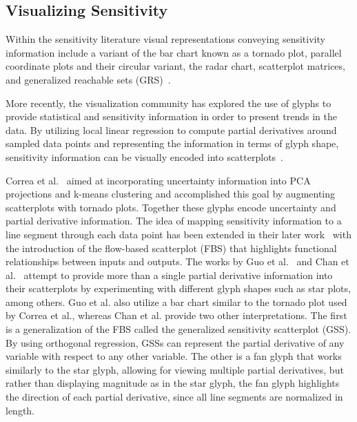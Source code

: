 \subsection{Visualizing Sensitivity}
\label{sec:SA_visualization}
Within the sensitivity literature visual representations conveying sensitivity information include a variant of the bar chart known as a tornado plot, parallel coordinate plots and their circular variant, the radar chart, scatterplot matrices,  and generalized reachable sets (GRS)~\cite{SaltelliChanScott2000,BushenkovChernykhKamenev1995}.

More recently, the visualization community has explored the use of glyphs to provide statistical and sensitivity information in order to present trends in the data.
%
By utilizing local linear regression to compute partial derivatives around sampled data points and representing the information in terms of glyph shape, sensitivity information can be visually encoded into scatterplots~\cite{CorreaChanMa2009,ChanCorreaMa2010,GuoWardRundensteiner2011,ChanCorreaMa2013}.

Correa et al.~\cite{CorreaChanMa2009} aimed at incorporating uncertainty information into PCA projections and k-means clustering and accomplished this goal by augmenting scatterplots with tornado plots.
%
Together these glyphs encode uncertainty and partial derivative information.
%
The idea of mapping sensitivity information to a line segment through each data point has been extended in their later work~\cite{ChanCorreaMa2010} with the introduction of the flow-based scatterplot (FBS) that highlights functional relationships between inputs and outputs.
%
The works by Guo et al.~\cite{GuoWardRundensteiner2011} and Chan et al.~\cite{ChanCorreaMa2013} attempt to provide more than a single partial derivative information into their scatterplots by experimenting with different glyph shapes such as star plots, among others.
%
Guo et al. also utilize a bar chart similar to the tornado plot used by Correa et al., whereas Chan et al. provide two other interpretations.
%
The first is a generalization of the FBS called the generalized sensitivity scatterplot (GSS).
%
By using orthogonal regression, GSSs can represent the partial derivative of any variable with respect to any other variable.
%
The other is a fan glyph that works similarly to the star glyph, allowing for viewing multiple partial derivatives, but rather than displaying magnitude as in the star glyph, the fan glyph highlights the direction of each partial derivative, since all line segments are normalized in length.

